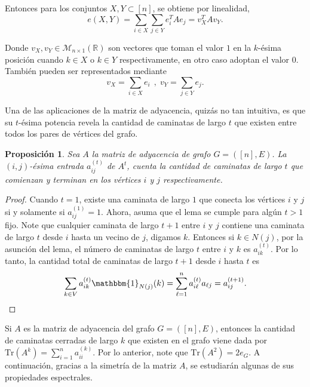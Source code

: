 \documentclass{article}[14pts]
\newtheorem{prop}{Proposición}
\newcommand{\Tr}{\mathrm{Tr}}
\begin{document}
Entonces para los conjuntos $X,Y\subset [n]$, se obtiene por linealidad,
\begin{equation} \label{e(X,Y)=espectral}
    e(X,Y) = \sum_{i\in X}\sum_{j\in Y} e_{i}^{T} A e_{j} = v_{X}^{T} A v_{Y}.
\end{equation}

Donde $v_{X}, v_{Y}\in\mathcal{M}_{n\times 1}(\mathbb{R})$ son vectores que toman el valor $1$ en la $k$-ésima posición cuando $k\in X$ o $k\in Y$ respectivamente, en otro caso adoptan el valor $0$. También pueden ser representados mediante
\begin{equation*}
    v_X = \sum_{i\in X}e_{i}\ \ \text{,}\ \ v_Y = \sum_{j\in Y}e_{j}.
\end{equation*}

Una de las aplicaciones de la matriz de adyacencia, quizás no tan intuitiva, es que su $t$-ésima potencia revela la cantidad de caminatas de largo $t$ que existen entre todos los pares de vértices del grafo.

\begin{prop} \label{potencia_matriz_adyacencia = caminatas}
    Sea $A$ la matriz de adyacencia de grafo $G = ([n], E)$. La $(i,j)$-ésima entrada $a_{ij}^{(t)}$ de $A^{t}$, cuenta la cantidad de caminatas de largo $t$ que comienzan y terminan en los vértices $i$ y $j$ respectivamente.
\end{prop}
\begin{proof}
    Cuando $t=1$, existe una caminata de largo $1$ que conecta los vértices $i$ y $j$ si y solamente si $a_{ij}^{(1)} = 1$. Ahora, asuma que el lema se cumple para algún $t > 1$ fijo. Note que cualquier caminata de largo $t+1$ entre $i$ y $j$ contiene una caminata de largo $t$ desde $i$ hasta un vecino de $j$, digamos $k$. Entonces si $k\in N(j)$, por la asunción del lema, el número de caminatas de largo $t$ entre $i$ y $k$ es $a_{ik}^{(t)}$. Por lo tanto, la cantidad total de caminatas de largo $t+1$ desde $i$ hasta $t$ es
    \begin{equation*}
        \displaystyle\sum_{k\in V} a_{ik}^{(t)}\mathbbm{1}_{N(j)}(k) = \displaystyle\sum_{\ell=1}^{n}a_{i\ell}^{(t)}a_{\ell j} = a_{ij}^{(t+1)}.
    \end{equation*}
\end{proof}

Si $A$ es la matriz de adyacencia del grafo $G = ([n], E)$, entonces la cantidad de caminatas cerradas de largo $k$ que existen en el grafo viene dada por $\Tr(A^{k}) = \sum_{i=1}^{n}a_{ii}^{(k)}$. Por lo anterior, note que $\Tr(A^{2}) = 2e_G$. A continuación, gracias a la simetría de la matriz $A$, se estudiarán algunas de sus propiedades espectrales.\medskip
\end{document}
